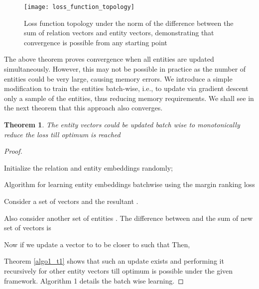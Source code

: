 \documentclass[sigconf]{acmart}
\newtheorem{theorem}{Theorem}[section]
\begin{document}
\begin{figure}[h!]
  \texttt{[image: loss\_function\_topology]}
  \caption{Loss function topology under the  norm of the difference between the sum of relation vectors and entity vectors, demonstrating that convergence is possible from any starting point}
  \label{loss_topology}
  \vspace{-2mm}
\end{figure}
The above theorem proves convergence when all entities are updated simultaneously. However, this may not be possible in practice as the number of entities could be very large, causing memory errors. We introduce a simple modification to train the entities batch-wise, i.e., to update via gradient descent only a sample of the entities, thus reducing memory requirements. We shall see in the next theorem that this approach also converges.
\begin{theorem}\label{algo1_t2}
The entity vectors could be updated batch wise to monotonically reduce the loss till optimum is reached
\end{theorem}
\begin{proof}
\begin{algorithm}
\label{algo_1}
\small
\SetAlgoNoLine
 Initialize the relation and entity embeddings randomly; \leavevmode\newline 
{}
 \caption{Algorithm for learning entity embeddings batchwise using the margin ranking loss}
\end{algorithm}

Consider a set of vectors  and the resultant .

Also consider another set of entities .
The difference between  and the sum of new set of vectors is

\par \noindent Now if we update a vector   to  to be closer to  such that 
Then,

\par \noindent Theorem \ref{algo1_t1} shows that such an update exists and performing it recursively for other entity vectors till optimum is possible under the given framework. Algorithm 1 details the batch wise learning.

\end{proof}
\end{document}
